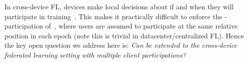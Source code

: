 \documentclass{article}
\begin{document}
In cross-device FL, devices make local decisions about if and when they will participate in training~\citep{FLO,bonawitz2019towards}. This makes it practically difficult to enforce the \multiepoch-participation of~\citet{choquette2022multi}, where users are assumed to participate at the same relative position in each epoch (note this is trivial in datacenter/centralized FL).
Hence the key open question we address here is: \emph{Can \MFFTRL be extended to the cross-device federated learning setting with multiple client participations?} 



\end{document}
